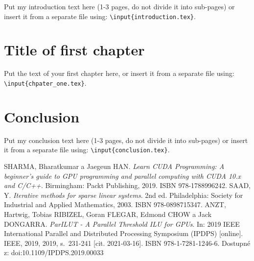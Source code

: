 \documentclass[12pt,a4paper,oneside,czech,american]{book} %
\newcommand{\ti}{\textit} %
\begin{document}
Put my introduction text here (1-3 pages, do not divide it into sub-pages) or insert it from a separate file using: \texttt{\textbackslash input\{introduction.tex\}}.



\chapter{Title of first chapter}
Put the text of your first chapter here, or insert it from a separate file using: \texttt{\textbackslash input\{chpater\_one.tex\}}.




\chapter*{Conclusion} %

Put my conclusion text here (1-3 pages, do not divide it into sub-pages) or insert it from a separate file using: \texttt{\textbackslash input\{conclusion.tex\}}.




\clearpage  							   	 %

\begin{thebibliography}{3}
	SHARMA, Bharatkumar a Jaegeun HAN. \textit{Learn CUDA Programming: A beginner's guide to GPU programming and parallel computing with CUDA 10.x and C/C++}. Birmingham: Packt Publishing, 2019. ISBN 978-1788996242.
	SAAD, Y. \textit{Iterative methods for sparse linear systems}. 2nd ed. Philadelphia: Society for Industrial and Applied Mathematics, 2003. ISBN 978-0898715347.
	ANZT, Hartwig, Tobias RIBIZEL, Goran FLEGAR, Edmond CHOW a Jack DONGARRA. \ti{ParILUT - A Parallel Threshold ILU for GPUs}. In: 2019 IEEE International Parallel and Distributed Processing Symposium (IPDPS) [online]. IEEE, 2019, 2019, s.~231-241 [cit. 2021-03-16]. ISBN 978-1-7281-1246-6. Dostupné z: doi:10.1109/IPDPS.2019.00033
	
\end{thebibliography}
\end{document}
